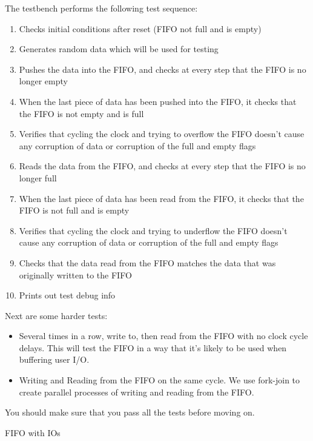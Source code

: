 \documentclass[11pt]{article}
\makeatletter
\renewcommand{\subsection}
{\@startsection {subsection}{1}{0pt}
 {-1ex}
 {0.5ex}
 {\bfseries\normalsize}}
\makeatother
\begin{document}
The testbench performs the following test sequence:
\begin{enumerate}
    \item Checks initial conditions after reset (FIFO not full and is empty)
    \item Generates random data which will be used for testing
    \item Pushes the data into the FIFO, and checks at every step that the FIFO is no longer empty
    \item When the last piece of data has been pushed into the FIFO, it checks that the FIFO is not empty and is full
    \item Verifies that cycling the clock and trying to overflow the FIFO doesn't cause any corruption of data or corruption of the full and empty flags
    \item Reads the data from the FIFO, and checks at every step that the FIFO is no longer full
    \item When the last piece of data has been read from the FIFO, it checks that the FIFO is not full and is empty
    \item Verifies that cycling the clock and trying to underflow the FIFO doesn't cause any corruption of data or corruption of the full and empty flags
    \item Checks that the data read from the FIFO matches the data that was originally written to the FIFO
    \item Prints out test debug info
\end{enumerate}

Next are some harder tests:

\begin{itemize}
    \item Several times in a row, write to, then read from the FIFO with no clock cycle delays.
      This will test the FIFO in a way that it's likely to be used when buffering user I/O.

    \item Writing and Reading from the FIFO on the same cycle. We use fork-join to create parallel processes of writing and reading from the FIFO.
\end{itemize}

You should make sure that you pass all the tests before moving on.

\subsection{FIFO with IOs}
\end{document}
